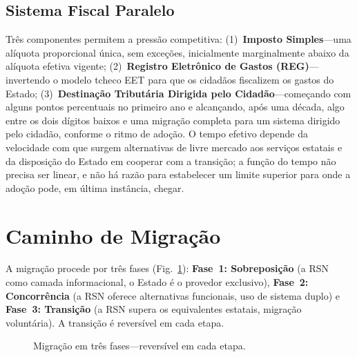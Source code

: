\documentclass[11pt,a4paper,twocolumn]{article}
\begin{document}
\subsection{Sistema Fiscal Paralelo}

Três componentes permitem a pressão competitiva: (1)~\textbf{Imposto Simples}---uma alíquota proporcional única, sem exceções, inicialmente marginalmente abaixo da alíquota efetiva vigente; (2)~\textbf{Registro Eletrônico de Gastos (REG)}---invertendo o modelo tcheco EET para que os cidadãos fiscalizem os gastos do Estado; (3)~\textbf{Destinação Tributária Dirigida pelo Cidadão}---começando com alguns pontos percentuais no primeiro ano e alcançando, após uma década, algo entre os dois dígitos baixos e uma migração completa para um sistema dirigido pelo cidadão, conforme o ritmo de adoção. O tempo efetivo depende da velocidade com que surgem alternativas de livre mercado aos serviços estatais e da disposição do Estado em cooperar com a transição; a função do tempo não precisa ser linear, e não há razão para estabelecer um limite superior para onde a adoção pode, em última instância, chegar.

\section{Caminho de Migração}

A migração procede por três fases (Fig.~\ref{fig:migration}): \textbf{Fase~1: Sobreposição} (a RSN como camada informacional, o Estado é o provedor exclusivo), \textbf{Fase~2: Concorrência} (a RSN oferece alternativas funcionais, uso de sistema duplo) e \textbf{Fase~3: Transição} (a RSN supera os equivalentes estatais, migração voluntária). A transição é reversível em cada etapa.

\begin{figure}[ht]
\centering
{}
\caption{Migração em três fases---reversível em cada etapa.}
\label{fig:migration}
\end{figure}
\end{document}
